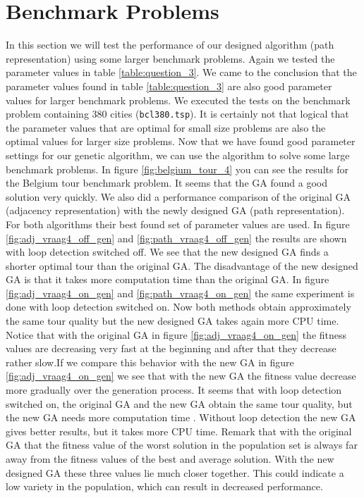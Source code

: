 

\section{Benchmark Problems}

In this section we will test the performance of our designed algorithm (path representation) using some larger benchmark problems. Again we tested the parameter values in table \ref{table:question_3}. We came to the conclusion that the parameter values found in table \ref{table:question_3} are also good parameter values for larger benchmark problems. We executed the tests on the benchmark problem containing 380 cities (\texttt{bcl380.tsp}). It is certainly not that logical that the parameter values that are optimal for small size problems are also the optimal values for larger size problems. Now that we have found good parameter settings for our genetic algorithm, we can use the algorithm to solve some large benchmark problems.
In figure \ref{fig:belgium_tour_4} you can see the results for the Belgium tour benchmark problem. It seems that the GA found a good solution very quickly. 
\newline
\newline
We also did a performance comparison of the original GA (adjacency representation) with the newly designed GA (path representation). For both algorithms their best found set of parameter values are used. In figure \ref{fig:adj_vraag4_off_gen} and \ref{fig:path_vraag4_off_gen} the results are shown with loop detection switched off. We see that the new designed GA finds a shorter optimal tour than the original GA. The disadvantage of the new designed GA is that it takes more computation time than the original GA. In figure \ref{fig:adj_vraag4_on_gen} and \ref{fig:path_vraag4_on_gen} the same experiment is done with loop detection switched on. Now both methods obtain approximately the same tour quality but the new designed GA takes again more CPU time. Notice that with the original GA in figure \ref{fig:adj_vraag4_on_gen} the fitness values are decreasing very fast at the beginning and after that they decrease rather slow.If we compare this behavior with the new GA in figure \ref{fig:adj_vraag4_on_gen} we see that with the new GA the fitness value decrease more gradually over the generation process. 
\newline
\newline
It seems that with loop detection switched on, the original GA and the new GA obtain the same tour quality, but the new GA needs more computation time . Without loop detection the new GA gives better results, but it takes more CPU time. Remark that with the original GA that the fitness value of the worst solution in the population set is always far away from the fitness values of the best and average solution. With the new designed GA these three values lie much closer together. This could indicate a low variety in the population, which can result in decreased performance.

